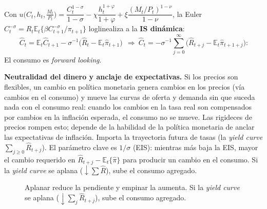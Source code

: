 \documentclass[11pt]{article}
\renewcommand{\boxed}[1]{#1}     %
\newenvironment{notabox}[1][Nota]%
  {\par\medskip\noindent\textbf{#1.}\enspace\ignorespaces}%
  {\par\medskip}
\theoremstyle{definition}
\newcommand{\E}{\mathbb{E}}
\begin{document}
Con
$u\big(C_{t},h_{t},\tfrac{M_{t}}{P_{t}}\big)
=\dfrac{C_{t}^{1-\sigma}}{1-\sigma}-\chi\dfrac{h_{t}^{1+\varphi}}{1+\varphi}
+\xi\dfrac{(M_{t}/P_{t})^{1-\nu}}{1-\nu}$,
la Euler $C_{t}^{-\sigma}=R_{t}\E_{t}\{\beta C_{t+1}^{-\sigma}/\pi_{t+1}\}$ loglinealiza a la
\textbf{IS dinámica}:
\begin{equation}
\boxed{\ \widehat{C}_{t}=\E_{t}\widehat{C}_{t+1}-\sigma^{-1}\big(\widehat{R}_{t}-\E_{t}\widehat{\pi}_{t+1}\big)\ }
\ \Longrightarrow\
\widehat{C}_{t}=-\sigma^{-1}\sum_{j=0}^{\infty}\big(\widehat{R}_{t+j}-\E_{t}\widehat{\pi}_{t+1+j}\big):
\end{equation}
El consumo es \emph{forward looking}.

\begin{notabox}[Neutralidad del dinero y anclaje de expectativas]
Si los precios son flexibles, un cambio en política monetaria genera cambios en los precios (vía
cambios en el consumo) y mueve las curvas de oferta y demanda sin que suceda nada con el consumo
real: cuando los cambios en la tasa real son compensados por cambios en la inflación esperada, el
consumo no se mueve. Las rigideces de precios rompen esto; depende de la habilidad de la política
monetaria de anclar las expectativas de inflación. Importa la trayectoria futura de tasas (la
\emph{yield curve} $\sum_{j\ge0}\widehat{R}_{t+j}$). El parámetro clave es $1/\sigma$ (EIS): mientras
más baja la EIS, mayor el cambio requerido en $\widehat{R}_{t+j}-\E_{t}\{\widehat{\pi}\}$ para producir
un cambio en el consumo. Si la \emph{yield curve} se aplana ($\downarrow\sum\widehat{R}$), sube el
consumo agregado.
\end{notabox}

\begin{figure}[h]
\centering
{}
\caption{Aplanar reduce la pendiente y empinar la aumenta. Si la \emph{yield curve} se aplana
($\downarrow\sum_{j}\widehat{R}_{t+j}$), sube el consumo agregado.}
\end{figure}
\end{document}
